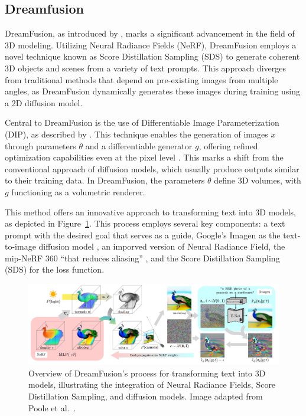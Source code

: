 \subsection{Dreamfusion}\label{dreamfusion}

DreamFusion, as introduced by \citeauthor{pooleDreamfusion}, marks a significant advancement in the field of 3D modeling. Utilizing Neural Radiance Fields (NeRF), DreamFusion employs a novel technique known as Score Distillation Sampling (SDS) to generate coherent 3D objects and scenes from a variety of text prompts. This approach diverges from traditional methods that depend on pre-existing images from multiple angles, as DreamFusion dynamically generates these images during training using a 2D diffusion model.

Central to DreamFusion is the use of Differentiable Image Parameterization (DIP), as described by \citep{mordvintsevDIP}. This technique enables the generation of images \( x \) through parameters \( \theta \) and a differentiable generator \( g \), offering refined optimization capabilities even at the pixel level \citep{pooleDreamfusion}. This marks a shift from the conventional approach of diffusion models, which usually produce outputs similar to their training data. In DreamFusion, the parameters \( \theta \) define 3D volumes, with \( g \) functioning as a volumetric renderer. 

This method offers an innovative approach to transforming text into 3D models, as depicted in Figure~\ref{fig:figureDreamfusion}. This process employs several key components: a text prompt with the desired goal that serves as a guide, Google's Imagen as the text-to-image diffusion model \citep{saharia2022imagen}, an imporved version of Neural Radiance Field, the mip-NeRF 360 \citep{barron2022mipnerf} ``that reduces aliasing'' \citep{pooleDreamfusion}, and the Score Distillation Sampling (SDS) for the loss function.

\begin{figure}[ht]
  \centering
    \includegraphics[width=1\columnwidth]{figures/Dreamfusion.png}
    \caption{Overview of DreamFusion's process for transforming text into 3D models, illustrating the integration of Neural Radiance Fields, Score Distillation Sampling, and diffusion models. Image adapted from Poole et al.~\citep{pooleDreamfusion}.}\label{fig:figureDreamfusion}
\end{figure}

